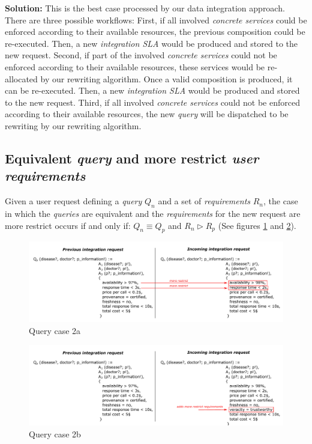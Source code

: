 \bigskip
\noindent \textbf{Solution:} This is the best case processed by our data integration approach. There are three possible workflows: First, if all involved \textsl{concrete services} could be enforced according to their available resources, the previous composition could be re-executed. Then, a new \textsl{integration SLA} would be produced and stored to the new request. Second, if part of the involved \textsl{concrete services} could not be enforced according to their available resources, these services would be re-allocated by our rewriting algorithm. Once a valid composition is produced, it can be re-executed. Then, a new \textsl{integration SLA} would be produced and stored to the new request. Third, if all involved \textsl{concrete services} could not be enforced according to their available resources, the new \textsl{query} will be dispatched to be rewriting by our rewriting algorithm.

\subsection{Equivalent \textsl{query} and more restrict \textsl{user requirements}}
Given a user request defining a \textsl{query} $Q_{n}$ and a set of \textsl{requirements} $R_{n}$, the case in which the \textsl{queries} are equivalent and the \textsl{requirements} for the new request are more restrict occurs if and only if: $Q_{n} \equiv Q_{p}$ and $R_{n} \triangleright R_{p}$ (See figures \ref{fig:case2a} and \ref{fig:case2b}).

\begin{figure}[h!]
\center
\includegraphics[scale=0.85]{figures/query-case-2a.pdf}\caption{Query case 2a}\label{fig:case2a}
\end{figure}

\begin{figure}[h!]
\center
\includegraphics[scale=0.85]{figures/query-case-2b.pdf}\caption{Query case 2b}\label{fig:case2b}
\end{figure}

